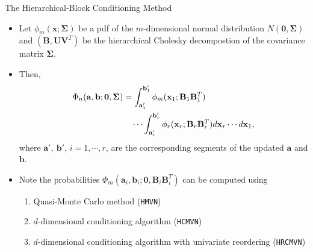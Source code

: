 \begin{frame}{The Hierarchical-Block Conditioning Method}
\begin{itemize}
	\item Let $\phi_m(\mathbf{x}; \boldsymbol{\Sigma})$ be a pdf of the $m$-dimensional normal distribution $N(\mathbf{0}, \boldsymbol{\Sigma})$ and $(\mathbf{B}, \mathbf{U}\mathbf{V}^T)$ be the hierarchical Cholesky decompostion of the covariance matrix $\boldsymbol{\Sigma}$. 
	\item Then,
		\begin{align}\label{eqn:hmvn}
		\Phi_n(\mathbf{a}, \mathbf{b}; \mathbf{0}, \boldsymbol{\Sigma}) \notag
		&= \int_{\mathbf{a}_1'}^{\mathbf{b}_1'} \phi_m(\mathbf{x}_1; \mathbf{B}_1\mathbf{B}_1^T) 
		\\ &\quad \cdots \int_{\mathbf{a}_r'}^{\mathbf{b}_r'} \phi_r(\mathbf{x}_r; \mathbf{B}_r\mathbf{B}_r^T) d\mathbf{x}_r \cdots d\mathbf{x}_1,
		\end{align}
		where $\mathbf{a}',~\mathbf{b}'$, $i=1,\cdots,r$, are the corresponding segments of the updated $\mathbf{a}$ and $\mathbf{b}$. 
	\item Note the probabilities $\Phi_m(\mathbf{a}_i, \mathbf{b}_i; \mathbf{0}, \mathbf{B}_i\mathbf{B}_i^T)$ can be computed using
		\begin{enumerate}
			\item Quasi-Monte Carlo method (\texttt{HMVN}) %
			\item $d$-dimensional conditioning algorithm (\texttt{HCMVN}) %
			\item $d$-dimensional conditioning algorithm with univariate reordering (\texttt{HRCMVN})%
		\end{enumerate} 
	\end{itemize}

\end{frame}

